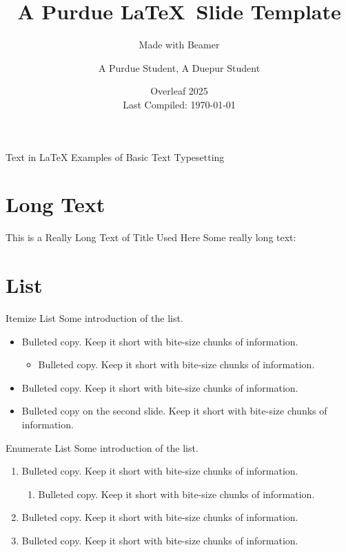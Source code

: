 \documentclass{purdue-slide}
\title{A Purdue \LaTeX\ Slide Template}
\subtitle{Made with Beamer}
\author{A Purdue Student\texorpdfstring{\footnotemark[1]}{}, A Duepur Student\texorpdfstring{\footnotemark[2]}{}}
\institute{\texorpdfstring{\footnotemark[1]}{}Purdue University, \texorpdfstring{\footnotemark[2]}{}Duepur University}
\date{Overleaf 2025 \\ Last Compiled: \mbox{\today}}
\begin{document}
\begin{titleframe}{}
    \maketitle
\end{titleframe}

\begin{titleframe}{Text in \LaTeX}
    Examples of Basic Text Typesetting
\end{titleframe}

\section{Long Text}

\begin{frame}{This is a Really Long Text of Title Used Here}
    Some really long text:
    
    \bigskip
    
    \lipsum[2]
\end{frame}

\section{List}

\begin{frame}{Itemize List}
    Some introduction of the list.
    \begin{itemize}
        \item Bulleted copy. Keep it short with bite-size chunks of information.
        \begin{itemize}
            \item Bulleted copy. Keep it short with bite-size chunks of information.
        \end{itemize}
        \item Bulleted copy. Keep it short with bite-size chunks of information.
        \pause\item Bulleted copy on the second slide. Keep it short with bite-size chunks of information.
    \end{itemize}
\end{frame}

\begin{frame}{Enumerate List}
    Some introduction of the list.
    \begin{enumerate}
        \item Bulleted copy. Keep it short with bite-size chunks of information.
        \begin{enumerate}
            \item Bulleted copy. Keep it short with bite-size chunks of information.
        \end{enumerate}
        \item Bulleted copy. Keep it short with bite-size chunks of information.
        \item Bulleted copy. Keep it short with bite-size chunks of information.
    \end{enumerate}
\end{frame}
\end{document}
